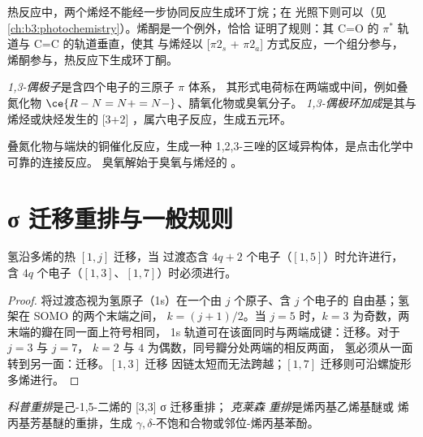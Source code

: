 热反应中，两个烯烃不能经一步协同反应生成环丁烷；在
光照下则可以（见\cref{ch:b3:photochemistry}）。烯酮是一个例外，恰恰
证明了规则：其 C=O 的 $\pi^*$ 轨道与 C=C 的轨道垂直，使其
与烯烃以 [$\pi2_s$ + $\pi2_a$] 方式反应，一个组分参与，
烯酮参与，热反应下生成环丁酮。

\begin{definition}[1,3-偶极环加成]\label{def:b3:pericyclic:dipolar}
\emph{1,3-偶极子}是含四个电子的三原子 $\pi$ 体系，
其形式电荷标在两端或中间，例如叠氮化物
$\ce{R-N=N+=N-}$、腈氧化物或臭氧分子。
\emph{1,3-偶极环加成}是其与烯烃或炔烃发生的
[3+2] ，属六电子反应，生成五元环。
\end{definition}

叠氮化物与端炔的铜催化反应，生成一种
1,2,3-三唑的区域异构体，是点击化学中可靠的连接反应。
臭氧解始于臭氧与烯烃的
。

\section{σ 迁移重排与一般规则}

\begin{proposition}[氢的迁移]\label{prop:b3:pericyclic:sigmatropic-h}
氢沿多烯的热 $[1, j]$ 迁移，当
过渡态含 $4q + 2$ 个电子（$[1,5]$）时允许进行，
含 $4q$ 个电子（$[1,3]$、$[1,7]$）时必须进行。
\end{proposition}

\begin{proof}
将过渡态视为氢原子（1s）在一个由 $j$ 个原子、含 $j$ 个电子的
自由基；氢架在 SOMO 的两个末端之间，
$k = (j + 1)/2$。当 $j = 5$ 时，$k = 3$ 为奇数，两末端的瓣在同一面上符号相同，
1s 轨道可在该面同时与两端成键：迁移。对于 $j = 3$ 与 $j = 7$，
$k = 2$ 与 $4$ 为偶数，同号瓣分处两端的相反两面，
氢必须从一面转到另一面：迁移。$[1,3]$ 迁移
因链太短而无法跨越；$[1,7]$ 迁移则可沿螺旋形多烯进行。
\end{proof}

\begin{definition}[科普重排与克莱森重排]\label{def:b3:pericyclic:cope-claisen}
\emph{科普重排}是己-1,5-二烯的 [3,3] σ 迁移重排；
\emph{克莱森
重排}是烯丙基乙烯基醚或
烯丙基芳基醚的重排，生成 $\gamma,\delta$-不饱和合物或邻位-烯丙基苯酚。
\end{definition}

